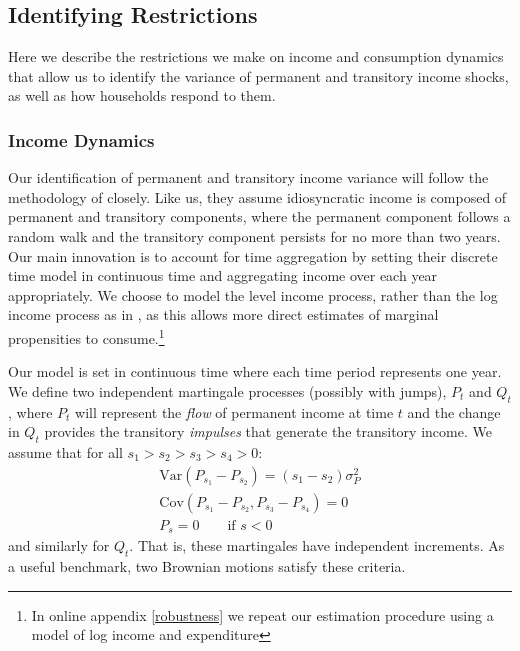 \documentclass[titlepage]{\econtex}\newcommand{\texname}{ConsumptionHeterogeneity}
\begin{document}
\subsection{Identifying Restrictions} \label{cov_restrictions}

Here we describe the restrictions we make on income and consumption dynamics that allow us to identify the variance of permanent and transitory income shocks, as well as how households respond to them. 

\subsubsection{Income Dynamics}
Our identification of permanent and transitory income variance will follow the methodology of \cite{carroll_nature_1997} closely. Like us, they assume idiosyncratic income is composed of permanent and transitory components, where the permanent component follows a random walk and the transitory component persists for no more than two years. Our main innovation is to account for time aggregation by setting their discrete time model in continuous time and aggregating income over each year appropriately. We choose to model the level income process, rather than the log income process as in \cite{carroll_nature_1997}, as this allows more direct estimates of marginal propensities to consume.\footnote{In online appendix \ref{robustness} we repeat our estimation procedure using a model of log income and expenditure}

Our model is set in continuous time where each time period represents one year. We define two independent martingale processes (possibly with jumps), $P_t$ and $Q_t$, where $P_t$ will represent the \textit{flow} of permanent income at time $t$ and the change in $Q_t$ provides the transitory \textit{impulses} that generate the transitory income. We assume that for all  $s_1>s_2>s_3>s_4>0$:
\begin{align*}
\mathrm{Var}(P_{s_1}-P_{s_2})=(s_1-s_2)\sigma_P^2 \\
\mathrm{Cov}(P_{s_1}-P_{s_2},P_{s_3}-P_{s_4}) = 0 \\
P_s = 0 \qquad \text{if } s<0
\end{align*}
and similarly for $Q_t$. That is, these martingales have independent increments. As a useful benchmark, two Brownian motions satisfy these criteria.
\end{document}
